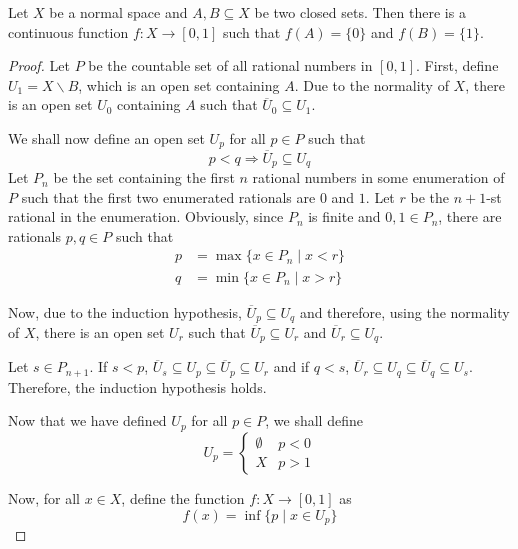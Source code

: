 \begin{lemma}[Urysohn]
    Let $X$ be a normal space and $A,B\subseteq X$ be two closed sets. Then there is a continuous function $f:X\to[0,1]$ such that $f(A) = \{0\}$ and $f(B) = \{1\}$.
\end{lemma}
\begin{proof}
    Let $P$ be the countable set of all rational numbers in $[0,1]$. First, define $U_1 = X\backslash B$, which is an open set containing $A$. Due to the normality of $X$, there is an open set $U_0$ containing $A$ such that $\overline{U}_0\subseteq U_1$.

    We shall now define an open set $U_p$ for all $p\in P$ such that 
    \begin{equation*}
        p < q \Longrightarrow\overline{U}_p\subseteq U_q
    \end{equation*}
    Let $P_n$ be the set containing the first $n$ rational numbers in some enumeration of $P$ such that the first two enumerated rationals are $0$ and $1$. Let $r$ be the $n + 1$-st rational in the enumeration. Obviously, since $P_n$ is finite and $0,1\in P_n$, there are rationals $p,q\in P$ such that 
    \begin{align*}
        p &= \max\{x\in P_n\mid x < r\}\\
        q &= \min\{x\in P_n\mid x > r\}
    \end{align*}

    Now, due to the induction hypothesis, $\overline{U}_p\subseteq U_q$ and therefore, using the normality of $X$, there is an open set $U_r$ such that $\overline{U}_p\subseteq U_r$ and $\overline{U}_r\subseteq U_q$.

    Let $s\in P_{n + 1}$. If $ s < p$, $\overline{U}_s\subseteq U_p\subseteq\overline{U}_p\subseteq U_r$ and if $q < s$, $\overline{U}_r\subseteq U_q\subseteq\overline{U}_q\subseteq U_s$. Therefore, the induction hypothesis holds.


    Now that we have defined $U_p$ for all $p\in P$, we shall define
    \begin{equation*}
        U_p = 
        \begin{cases}
            \emptyset & p < 0\\
            X & p > 1
        \end{cases}
    \end{equation*}

    Now, for all $x\in X$, define the function $f:X\to[0,1]$ as
    \begin{equation*}
        f(x) = \inf\{p\mid x\in U_p\}
    \end{equation*}


\end{proof}
